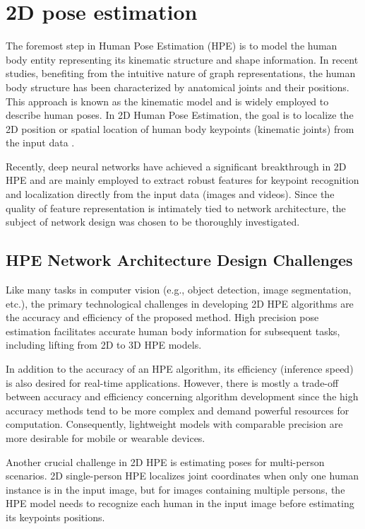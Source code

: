 \section{2D pose estimation}
The foremost step in Human Pose Estimation (HPE) is to model the human body entity representing its kinematic structure and shape information. In recent studies, benefiting from the intuitive nature of graph representations, the human body structure has been characterized by anatomical joints and their positions. This approach is known as the kinematic model and is widely employed to describe human poses. In 2D Human Pose Estimation, the goal is to localize the 2D position or spatial location of human body keypoints (kinematic joints) from the input data \cite{rafi_efficient_2016}.

Recently, deep neural networks have achieved a significant breakthrough in 2D HPE and are mainly employed to extract robust features for keypoint recognition and localization directly from the input data (images and videos). Since the quality of feature representation is intimately tied to network architecture, the subject of network design was chosen to be thoroughly investigated. 

\subsection{HPE Network Architecture Design Challenges}
Like many tasks in computer vision (e.g., object detection, image segmentation, etc.), the primary technological challenges in developing 2D HPE algorithms are the accuracy and efficiency of the proposed method. High precision pose estimation facilitates accurate human body information for subsequent tasks, including lifting from 2D to 3D HPE models. 

In addition to the accuracy of an HPE algorithm, its efficiency (inference speed) is also desired for real-time applications. However, there is mostly a trade-off between accuracy and efficiency concerning algorithm development since the high accuracy methods tend to be more complex and demand powerful resources for computation. Consequently, lightweight models with comparable precision are more desirable for mobile or wearable devices. 

Another crucial challenge in 2D HPE is estimating poses for multi-person scenarios. 2D single-person HPE localizes joint coordinates when only one human instance is in the input image, but for images containing multiple persons, the HPE model needs to recognize each human in the input image before estimating its keypoints positions. 

